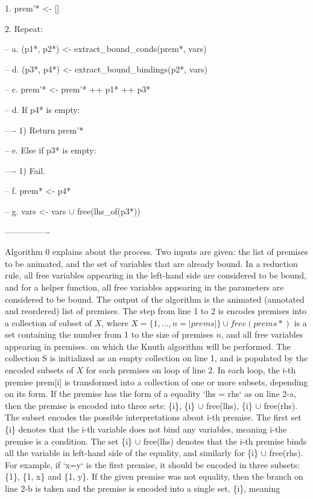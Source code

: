 1. prem'* <- []

2. Repeat:

-- a. (p1*, p2*) <- extract\_bound\_conds(prem*, vars)

-- d. (p3*, p4*) <- extract\_bound\_bindings(p2*, vars)

-- c. prem'* <- prem'* ++ p1* ++ p3*

-- d. If p4* is empty:

---- 1) Return prem'*

-- e. Else if p3* is empty:

---- 1) Fail.

-- f. prem* <- p4*

-- g. vars <- vars $\cup$ free(lhs\_of(p3*))

----------------

Algorithm 0 explains about the process.
Two inputs are given: the list of premises to be animated, and the set of variables that are already bound.
In a reduction rule, all free variables appearing in the left-hand side are considered to be bound,
and for a helper function, all free variables appearing in the parameters are considered to be bound.
The output of the algorithm is the animated (annotated and reordered) list of premises.
The step from line 1 to 2 is encodes premises into a collection of subset of $X$,
where $X = \{1, ..., n = |prems|\} \cup free(prems*)$ is a set containing the number from 1 to the size of
premises $n$, and all free variables appearing in premises.
on which the Knuth algorithm will be performed. The collection S is initialized as an empty collection on
line 1, and is populated by the encoded subsets of $X$ for each premises on loop of line 2.
In each loop, the i-th premise prem[i] is transformed into a collection of one or
more subsets, depending on its form. If the premise has the form of a equality `lhs = rhs` as on line 2-a,
then the premise is encoded into three sets: \{i\}, \{i\} $\cup$ free(lhs), \{i\} $\cup$ free(rhs). The subset encodes
the possible interpretations about i-th premise. The first set \{i\} denotes that
the i-th variable does not bind any variables, meaning i-the premise is a condition.
The set \{i\} $\cup$ free(lhs) denotes that the i-th premise binds all the variable in left-hand
side of the equality, and similarly for \{i\} $\cup$ free(rhs). For example, if `x=y` is the first premise,
it should be encoded in three subsets: \{1\}, \{1, x\} and \{1, y\}. If the given premise was not equality,
then the branch on line 2-b is taken and the premise is encoded into a single set, \{i\}, meaning
